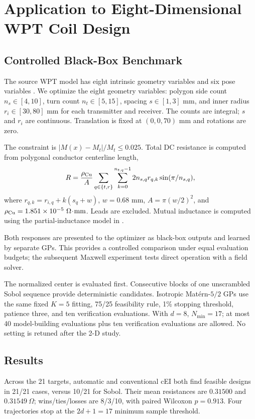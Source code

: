 \documentclass[10pt,conference,letterpaper]{IEEEtran}
\begin{document}
\section{Application to Eight-Dimensional WPT Coil Design}
\subsection{Controlled Black-Box Benchmark}
The source WPT model has eight intrinsic geometry variables and six pose variables \cite{asadi2025}. We optimize the eight geometry variables: polygon side count $n_s\in[4,10]$, turn count $n_t\in[5,15]$, spacing $s\in[1,3]$ mm, and inner radius $r_i\in[30,80]$ mm for each transmitter and receiver. The counts are integral; $s$ and $r_i$ are continuous. Translation is fixed at $(0,0,70)$ mm and rotations are zero.

The constraint is $|M(x)-M_t|/M_t\leq0.025$. Total DC resistance is computed from polygonal conductor centerline length,
\begin{equation}
 R=\frac{\rho_{\rm Cu}}{A}\sum_{q\in\{t,r\}}\sum_{k=0}^{n_{t,q}-1}
 2n_{s,q}r_{q,k}\sin(\pi/n_{s,q}),
 \label{eq:wpt-r}
\end{equation}
where $r_{q,k}=r_{i,q}+k(s_q+w)$, $w=0.68$ mm, $A=\pi(w/2)^2$, and $\rho_{\rm Cu}=1.851\times10^{-5}\ \Omega\!\cdot\!\mathrm{mm}$. Leads are excluded. Mutual inductance is computed using the partial-inductance model in \cite{asadi2025}.

Both responses are presented to the optimizer as black-box outputs and learned by separate GPs. This provides a controlled comparison under equal evaluation budgets; the subsequent Maxwell experiment tests direct operation with a field solver.

The normalized center is evaluated first. Consecutive blocks of one unscrambled Sobol sequence provide deterministic candidates. Isotropic Mat\'ern-$5/2$ GPs use the same fixed $K=5$ fitting, 75/25 feasibility rule, 1\% stopping threshold, patience three, and ten verification evaluations. With $d=8$, $N_{\min}=17$; at most 40 model-building evaluations plus ten verification evaluations are allowed. No setting is retuned after the 2-D study.

\subsection{Results}
Across the 21 targets, automatic and conventional cEI both find feasible designs in 21/21 cases, versus 10/21 for Sobol. Their mean resistances are $0.31500$ and $0.31549\ \Omega$; wins/ties/losses are 8/3/10, with paired Wilcoxon $p=0.913$. Four trajectories stop at the $2d+1=17$ minimum sample threshold.
\end{document}
